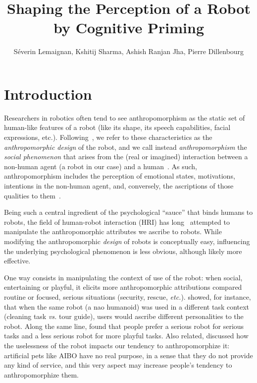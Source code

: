 \documentclass[lettersize, noapacite, twoside, HRI]{apa_HRI}
\title{Shaping the Perception of a Robot by Cognitive Priming}
\author{S\'everin Lemaignan, Kshitij Sharma, Ashish Ranjan Jha, Pierre
Dillenbourg}
\affiliation{CHILI Lab, \'Ecole Polytechnique F\'ed\'erale de Lausanne}
\newcommand{\etc}{\textit{etc.}\xspace}
\newcommand{\vs}{\textit{vs.}\xspace}
\begin{document}
\maketitle

\section{Introduction}

Researchers in robotics often tend to see anthropomorphism as the static set of
human-like features of a robot (like its shape, its speech capabilities, facial
expressions, etc.). Following~\citet{fink_anthropomorphism_2012}, we refer to
these characteristics as the \emph{anthropomorphic design} of the robot, and we
call instead \emph{anthropomorphism} the \emph{social phenomenon} that arises
from the (real or imagined) interaction between a non-human agent (a robot in
our case) and a human~\citep{persson_anthropomorphism_2000}. As such,
anthropomorphism includes the perception of emotional states, motivations,
intentions in the non-human agent, and, conversely, the ascriptions of those
qualities to them~\citep{epley_when_2008}.

Being such a central ingredient of the psychological ``sauce'' that binds humans to
robots, the field of human-robot interaction (HRI) has long~
attempted to manipulate the anthropomorphic attributes we ascribe to robots.
While modifying the anthropomorphic \emph{design} of robots is conceptually
easy, influencing the underlying psychological phenomenon is less
obvious, although likely more effective.

One way consists in manipulating the context of use of the robot: when social,
entertaining or playful, it elicits more anthropomorphic attributions compared
routine or focused, serious situations (security, rescue, \etc).
\citet{joosse_what_2013} showed, for instance, that when the same robot (a {\sc
nao} humanoid) was used in a different task context (cleaning task \vs tour
guide), users would ascribe different personalities to the robot. Along the same
line, \citet{goetz_cooperation_2002} found that people prefer a serious robot
for serious tasks and a less serious robot for more playful tasks. Also related,
\citet{kaplan_free_2000} discussed how the uselessness of the robot impacts our
tendency to anthropomorphize it: artificial pets like AIBO have no real purpose,
in a sense that they do not provide any kind of service, and this very aspect
may increase people's tendency to anthropomorphize them.
\end{document}
